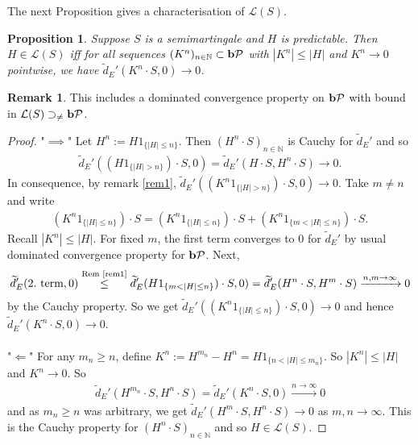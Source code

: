 \documentclass[12pt,a4paper, twoside]{article}
\newtheorem{prop}{Proposition}[section]
\theoremstyle{definition}
\newtheorem{rem}{Remark}[section]
\newcommand{\pred}{\textbf{\text{b}}\mathcal{P}}
\begin{document}
\newpage
The next Proposition gives a characterisation of $\mathcal{L}(S)$. 
\begin{prop} \label{P315} Suppose $S$ is a semimartingale and $H$ is predictable. Then $H \in \mathcal{L}(S)$ iff for all sequences $(K^n)_{n \in \mathbb{N}} \subset \pred$ with $|K^n| \leq |H|$ and $K^n \to 0$ pointwise, we have $\widetilde{d}_E'(K^n \cdot S,0) \to 0$. 
\end{prop}
\begin{rem} This includes a dominated convergence property on $\pred$ with bound in $\mathcal{L}(S) \supset_{\neq} \pred$. 
\end{rem}
\begin{proof}
"$\implies$" Let $H^n:= H 1_{\{ |H| \leq n\}}$. Then $(H^n \cdot S)_{n \in \mathbb{N}}$ is Cauchy for $\widetilde{d}_E'$ and so 
\begin{align*}
\widetilde{d}_E' ((H 1_{\{ |H| > n \}}) \cdot S,0) = \widetilde{d}_E' (H \cdot S, H^n  \cdot S) \to 0.
\end{align*}
In consequence, by remark \ref{rem1}, $\widetilde{d}_E'((K^n 1_{\{ | H| > n\}} ) \cdot S, 0) \to 0$. Take $m \neq n$ and write  
\begin{align*}
(K^n 1_{\{ |H| \leq n\}} ) \cdot S = (K^n 1_{\{ |H| \leq n\}}) \cdot S + (K^n 1_{\{ m < |H| \leq n \}}) \cdot S.
\end{align*}
Recall $|K^n| \leq |H|$. For fixed $m$, the first term converges to $0$ for $\tilde{d}_E'$ by usual dominated convergence property for $\pred$. Next, 
\begin{align*}
\widetilde{d}_E' ( 2. \text{ term},0) \overset{\text{Rem \ref{rem1}}}\leq \widetilde{d}_E' (H 1_{\{ m < |H| \leq n \}} ) \cdot S, 0) = \widetilde{d}_E' (H^n \cdot S, H^m \cdot S) \xrightarrow{n,m \to \infty} 0
\end{align*}
by the Cauchy property. So we get $\widetilde{d}_E'((K^n 1_{\{ |H| \leq n\}}) \cdot S, 0) \to 0$ and hence \\ $\widetilde{d}_E' (K^n \cdot S, 0) \to 0$.  \\
\\
"$\Longleftarrow$" For any $m_n \geq n$, define $K^n:= H^{m_n}-H^n= H 1_{\{ n < |H| \leq m_n\}}$. So $|K^n| \leq |H|$ and $K^n \to 0$. So   
\begin{align*}
\widetilde{d}_E' ( H^{m_n} \cdot S, H^n \cdot S) = \widetilde{d}_E' ( K^n \cdot S, 0 ) \xrightarrow{n \to \infty} 0
\end{align*}
and as $m_n \geq n$ was arbitrary, we get $\widetilde{d}_E'(H^m \cdot S, H^n \cdot S) \to 0$ as $m,n \to \infty$. This is the Cauchy property for $(H^n \cdot S)_{n \in \mathbb{N}}$ and so $H \in \mathcal{L}(S)$. 
\end{proof}
\end{document}

